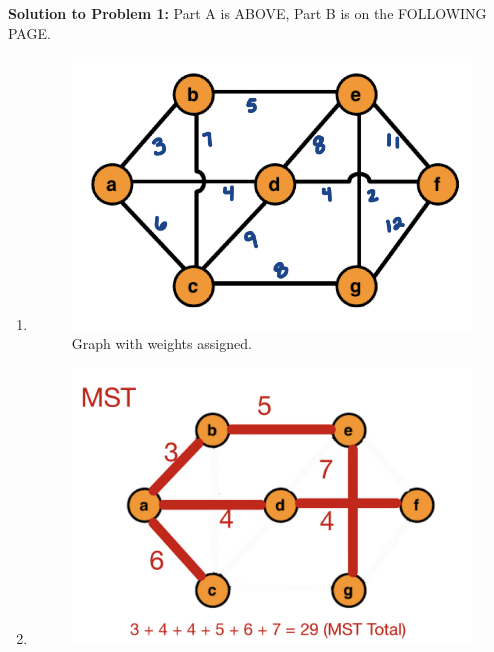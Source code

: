 \documentclass[12pt]{article}
\begin{document}
\begin{enumerate}
    \pagebreak
\textbf{Solution to Problem 1:}
Part A is ABOVE, Part B is on the FOLLOWING PAGE.
\newline \smallskip
\begin{enumerate}
    \item
\begin{figure}
\begin{center}
\includegraphics[scale=0.3]{weights.jpg} 
\caption{Graph with weights assigned.}
\end{center}
\end{figure}
    \item
\begin{figure}
\begin{center}
\includegraphics[scale=0.2]{MST.jpg}

\end{center}
\end{figure}
\end{enumerate}
\end{enumerate}
\end{document}
